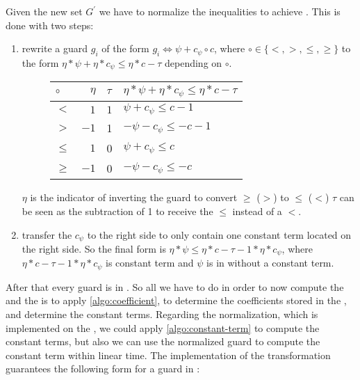 \begin{enumerate}
		Given the new set $G^\prime$ we have to normalize the inequalities to achieve \strG. This is done with two steps:
		\begin{enumerate}
			\item rewrite a guard $g_i$ of the form $g_i \Leftrightarrow \psi + c_{\psi} \circ c$, where $\circ \in \{<,>,\le,\ge\}$ to the form $ \eta*\psi + \eta*c_{\psi} \le \eta*c-\tau$ depending on $\circ$.\newline
			\begin{figure}[H]
				\centering
				\begin{tabular}{|l|r|l|l|}
					\hline
					$\circ$ 	& $\eta$ 	& $\tau$ 	&  $ \eta*\psi + \eta*c_{\psi} \le \eta*c-\tau$ \\ 
					\hline \hline
					$<$ 		& $1$ 		&  $1$ 		& $\psi + c_{\psi} \le c - 1$ \\ \hline
					$>$ 		& $-1$		&  1 		& $-\psi - c_{\psi} \le -c -1 $ \\ \hline
					$\le$ 		& $1$ 		&  0 		& $\psi + c_{\psi} \le c$ \\ \hline
					$\ge$ 		& $-1$ 		&  0 		& $-\psi - c_{\psi} \le -c$ \\ \hline
				\end{tabular}
			\end{figure}
			$\eta$ is the indicator of inverting the guard to convert $\ge$ ($>$) to $\le$ ($<$)\newline
			$\tau$ can be seen as the subtraction of 1 to receive the $\le$ instead of a $<$.
			\item transfer the $c_{\psi}$ to the right side to only contain one constant term located on the right side. So the final form is $\eta*\psi \le \eta*c -\tau -1*\eta*c_{\psi}$, where $\eta*c -\tau -1*\eta*c_{\psi}$ is constant term and $\psi$ is in \stdLinInt without a constant term.
		\end{enumerate}
\end{enumerate}
 After that every guard is in \strG. So all we have to do in order to now compute the \guardmatrix and the \guardconstants is to apply \autoref{algo:coefficient}, to determine the coefficients stored in the \guardmatrix, and determine the constant terms. \newline
 Regarding the normalization, which is implemented on the \rpntree, we could apply \autoref{algo:constant-term} to compute the constant terms, but also we can use the normalized guard to compute the constant term within linear time. The implementation of the transformation guarantees the following form for a guard in \strG:
 
